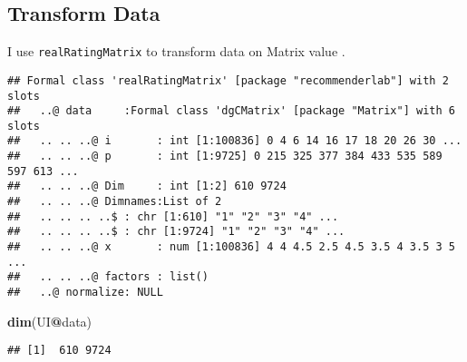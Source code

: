 \documentclass[]{article}
\newenvironment{Shaded}{\begin{snugshade}}{\end{snugshade}}
\newcommand{\CommentTok}[1]{\textcolor[rgb]{0.56,0.35,0.01}{\textit{#1}}}
\newcommand{\DataTypeTok}[1]{\textcolor[rgb]{0.13,0.29,0.53}{#1}}
\newcommand{\KeywordTok}[1]{\textcolor[rgb]{0.13,0.29,0.53}{\textbf{#1}}}
\newcommand{\NormalTok}[1]{#1}
\newcommand{\OperatorTok}[1]{\textcolor[rgb]{0.81,0.36,0.00}{\textbf{#1}}}
\newcommand{\StringTok}[1]{\textcolor[rgb]{0.31,0.60,0.02}{#1}}
\begin{document}
\hypertarget{transform-data}{%
\subsection{Transform Data}\label{transform-data}}

I use \texttt{realRatingMatrix} to transform data on Matrix value .

\begin{Shaded}
\end{Shaded}

\begin{verbatim}
## Formal class 'realRatingMatrix' [package "recommenderlab"] with 2 slots
##   ..@ data     :Formal class 'dgCMatrix' [package "Matrix"] with 6 slots
##   .. .. ..@ i       : int [1:100836] 0 4 6 14 16 17 18 20 26 30 ...
##   .. .. ..@ p       : int [1:9725] 0 215 325 377 384 433 535 589 597 613 ...
##   .. .. ..@ Dim     : int [1:2] 610 9724
##   .. .. ..@ Dimnames:List of 2
##   .. .. .. ..$ : chr [1:610] "1" "2" "3" "4" ...
##   .. .. .. ..$ : chr [1:9724] "1" "2" "3" "4" ...
##   .. .. ..@ x       : num [1:100836] 4 4 4.5 2.5 4.5 3.5 4 3.5 3 5 ...
##   .. .. ..@ factors : list()
##   ..@ normalize: NULL
\end{verbatim}

\begin{Shaded}
\begin{Highlighting}[]
\KeywordTok{dim}\NormalTok{(UI}\OperatorTok{@}\NormalTok{data)}
\end{Highlighting}
\end{Shaded}

\begin{verbatim}
## [1]  610 9724
\end{verbatim}
\end{document}
